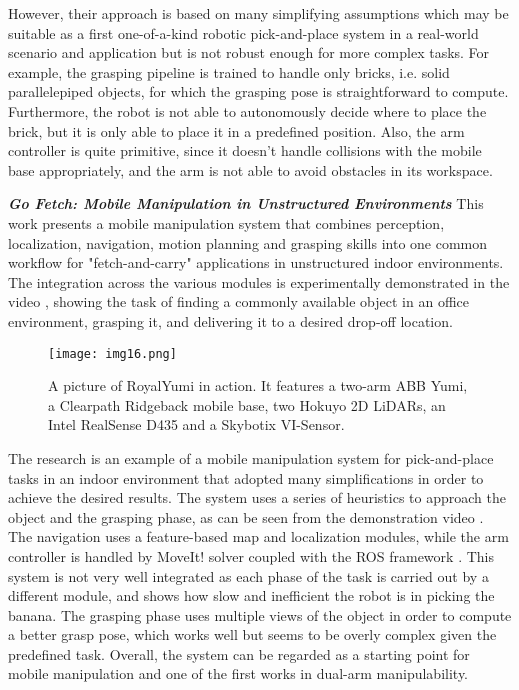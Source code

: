 However, their approach is based on many simplifying assumptions which may be suitable as a
first one-of-a-kind robotic pick-and-place system in a real-world scenario and application
but is not robust enough for more complex tasks. For example, the grasping pipeline
is trained to handle only bricks, i.e. solid parallelepiped objects, for which the grasping pose
is straightforward to compute. Furthermore, the robot is not able to autonomously decide
where to place the brick, but it is only able to place it in a predefined position.
Also, the arm controller is quite primitive, since it doesn't handle collisions with the mobile base
appropriately, and the arm is not able to avoid obstacles in its workspace.

\textbf{\textit{Go Fetch: Mobile Manipulation in Unstructured Environments}} \quad
This work \cite{blomqvist2020gofetch} presents a mobile manipulation system
that combines perception, localization, navigation,
motion planning and grasping skills into one common workflow
for "fetch-and-carry" applications in unstructured indoor environments.
The integration across the various modules is experimentally demonstrated
in the video \cite{youtube2020gofetch}, showing the task of finding a commonly available
object in an office environment, grasping it, and delivering it to a desired drop-off location.

\begin{figure}[ht]
	\centering
	\texttt{[image: img16.png]}
	\captionsetup{width=0.8\linewidth}
	\caption{A picture of RoyalYumi in action. It features a two-arm ABB Yumi, a Clearpath
		Ridgeback mobile base, two Hokuyo 2D LiDARs, an	Intel RealSense D435 and a Skybotix VI-Sensor.
		\cite{blomqvist2020gofetch}}
	\label{fig:img16}
\end{figure}

The research \cite{blomqvist2020gofetch} is an example of a mobile manipulation system
for pick-and-place tasks in an indoor environment that adopted many simplifications in order
to achieve the desired results. The system uses a series of heuristics to
approach the object and the grasping phase, as can be seen from the demonstration video
\cite{youtube2020gofetch}. The navigation uses a feature-based map and localization
modules, while the arm controller is handled by MoveIt! \cite{moveit2} solver coupled with
the ROS framework \cite{ros2}. This system is not very
well integrated as each phase of the task is carried out by a different module, and shows
how slow and inefficient the robot is in picking the banana. The grasping phase uses multiple
views of the object in order to compute a better grasp pose, which works well
but seems to be overly complex given the predefined task. Overall, the system
can be regarded as a starting point for mobile manipulation and one of the first
works in dual-arm manipulability.

